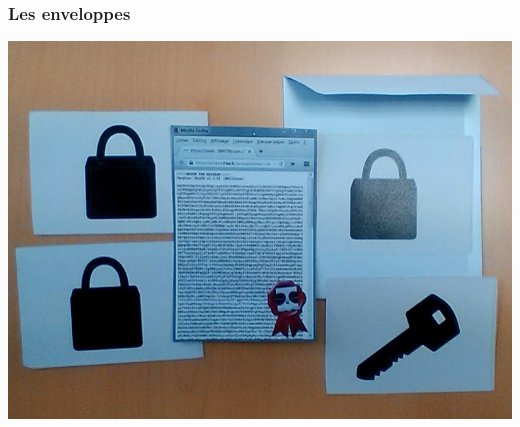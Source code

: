 \documentclass{beamer}
\begin{document}
\begin{frame}
\frametitle{Les enveloppes}

\begin{center}
\includegraphics[scale=0.4] {./images/gpg.jpg}
\end{center}
\end{frame}
\end{document}

